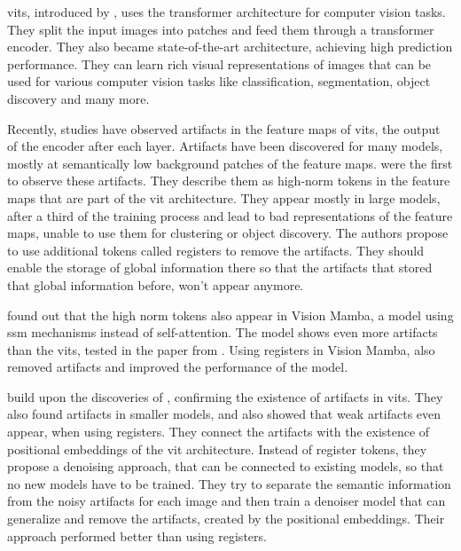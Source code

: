 \documentclass[conference]{IEEEtran}
\begin{document}
  \acfp{vit}, introduced by \citeauthor{visiontransformers2021} \cite{visiontransformers2021}, uses the transformer architecture for computer vision tasks. They split the input images into patches and feed them through a transformer encoder. They also became state-of-the-art architecture, achieving high prediction performance. They can learn rich visual representations of images that can be used for various computer vision tasks like classification, segmentation, object discovery and many more. \cite{visiontransformers2021} \cite{vit-state-challenges}

  Recently, studies have observed artifacts in the feature maps of \acp{vit}, the output of the encoder after each layer. Artifacts have been discovered for many models, mostly at semantically low background patches of the feature maps. \cite{registers} \cite{denoising} \citeauthor{registers} \cite{registers} were the first to observe these artifacts. They describe them as high-norm tokens in the feature maps that are part of the \ac{vit} architecture. They appear mostly in large models, after a third of the training process and lead to bad representations of the feature maps, unable to use them for clustering or object discovery. The authors propose to use additional tokens called registers to remove the artifacts. They should enable the storage of global information there so that the artifacts that stored that global information before, won't appear anymore.

  \citeauthor{mamba-needs-registers} \cite{mamba-needs-registers} found out that the high norm tokens also appear in Vision Mamba, a model using \ac{ssm} mechanisms instead of self-attention. The model shows even more artifacts than the \acp{vit}, tested in the paper from \citeauthor{registers} \cite{registers}. Using registers in Vision Mamba, also removed artifacts and improved the performance of the model. \cite{mamba-needs-registers}

  \citeauthor{denoising} \cite{denoising} build upon the discoveries of \citeauthor{registers} \cite{registers}, confirming the existence of artifacts in \acp{vit}. They also found artifacts in smaller models, and also showed that weak artifacts even appear, when using registers. They connect the artifacts with the existence of positional embeddings of the \ac{vit} architecture. Instead of register tokens, they propose a denoising approach, that can be connected to existing models, so that no new models have to be trained. They try to separate the semantic information from the noisy artifacts for each image and then train a denoiser model that can generalize and remove the artifacts, created by the positional embeddings. Their approach performed better than using registers. \cite{denoising}
\end{document}
